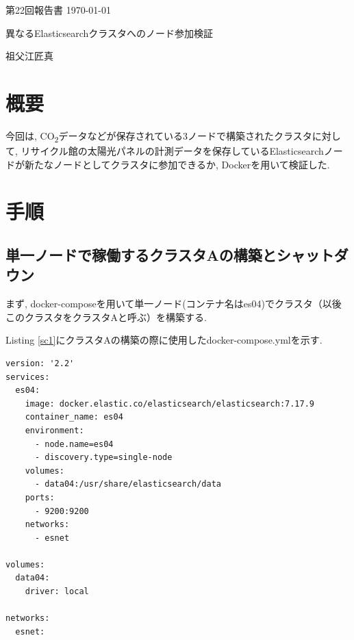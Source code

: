 \documentclass[a4j,12pt,]{jarticle}
\begin{document}
{\noindent\small 第22回報告書 \hfill\today}
\begin{center}
  {\Large 異なるElasticsearchクラスタへのノード参加検証}
\end{center}
\begin{flushright}
  祖父江匠真 \\
\end{flushright}

\section{概要}
今回は, CO\textsubscript{2}データなどが保存されている3ノードで構築されたクラスタに対して, リサイクル館の太陽光パネルの計測データを保存しているElasticsearchノードが新たなノードとしてクラスタに参加できるか, Dockerを用いて検証した.

\section{手順}

\subsection{単一ノードで稼働するクラスタAの構築とシャットダウン}

まず, docker-composeを用いて単一ノード(コンテナ名はes04)でクラスタ（以後このクラスタをクラスタAと呼ぶ）を構築する.

Listing \ref{sc1}にクラスタAの構築の際に使用したdocker-compose.ymlを示す.


\begin{lstlisting}[caption=クラスタAの構築の際に使用したdocker-compose.yml, label=sc1]
version: '2.2'
services:
  es04:
    image: docker.elastic.co/elasticsearch/elasticsearch:7.17.9
    container_name: es04
    environment:
      - node.name=es04
      - discovery.type=single-node
    volumes:
      - data04:/usr/share/elasticsearch/data
    ports:
      - 9200:9200
    networks:
      - esnet

volumes:
  data04:
    driver: local

networks:
  esnet:
\end{lstlisting}
\end{document}
